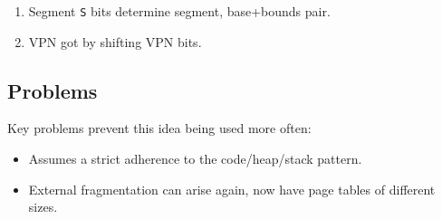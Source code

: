 \begin{enumerate}
\item Segment \texttt{S} bits determine segment, base+bounds pair.
\item VPN got by shifting VPN bits.
\end{enumerate}

\subsection{Problems}

Key problems prevent this idea being used more often: 

\begin{itemize}
\item Assumes a strict adherence to the code/heap/stack pattern.
\item External fragmentation can arise again, now have page tables of different sizes.
\end{itemize}


